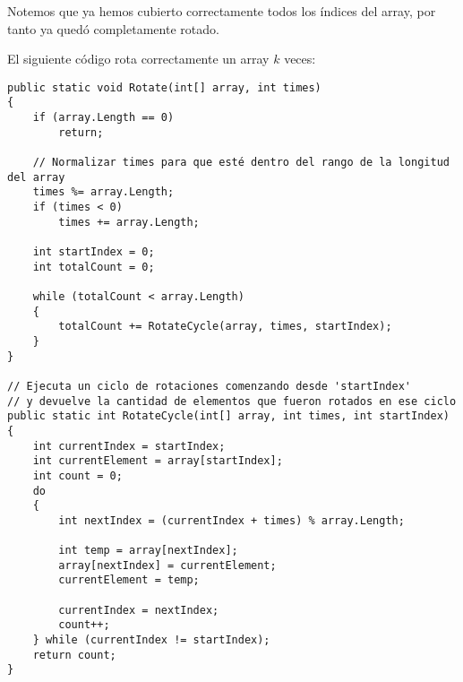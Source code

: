 Notemos que ya hemos cubierto correctamente todos los índices del array, por tanto ya quedó completamente rotado.

El siguiente código rota correctamente un array $k$ veces:

\begin{lstlisting}
public static void Rotate(int[] array, int times)
{
    if (array.Length == 0)
        return;

    // Normalizar times para que esté dentro del rango de la longitud del array
    times %= array.Length;
    if (times < 0)
        times += array.Length;
        
    int startIndex = 0;
    int totalCount = 0;
    
    while (totalCount < array.Length)
    {
        totalCount += RotateCycle(array, times, startIndex);
    }
}
    
// Ejecuta un ciclo de rotaciones comenzando desde 'startIndex'
// y devuelve la cantidad de elementos que fueron rotados en ese ciclo
public static int RotateCycle(int[] array, int times, int startIndex)
{
    int currentIndex = startIndex;
    int currentElement = array[startIndex];
    int count = 0;
    do
    {
        int nextIndex = (currentIndex + times) % array.Length;
        
        int temp = array[nextIndex];
        array[nextIndex] = currentElement;
        currentElement = temp;
        
        currentIndex = nextIndex;
        count++;
    } while (currentIndex != startIndex);
    return count;
}
\end{lstlisting}

